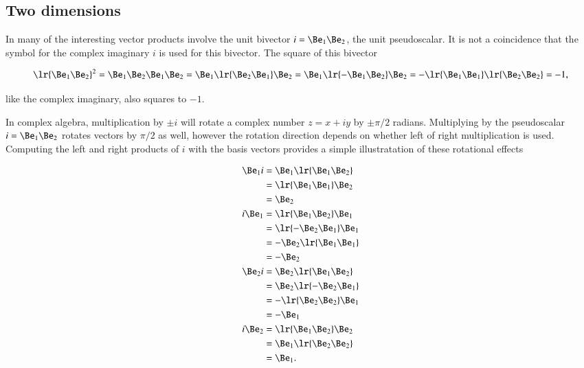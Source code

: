 
\subsection{Two dimensions}

In  many of the interesting vector products involve the unit bivector \( i = \Be_1 \Be_2 \), the  unit pseudoscalar.
It is not a coincidence that the symbol for the complex imaginary \( i \) is used for this bivector.
The square of this bivector

\begin{dmath}\label{eqn:SimpleProducts2:220}
   \lr{ \Be_1 \Be_2 }^2
   =
   \Be_1 \Be_2
   \Be_1 \Be_2
   =
   \Be_1 \lr{ \Be_2 \Be_1 } \Be_2
   =
   \Be_1 \lr{ -\Be_1 \Be_2 } \Be_2
   =
   -\lr{ \Be_1 \Be_1 }
   \lr{ \Be_2 \Be_2 }
   = -1,
\end{dmath}

like the complex imaginary, also squares to \( -1 \).

In complex algebra, multiplication by \( \pm i \) will rotate a complex number \( z = x + i y \) by \( \pm \pi/2 \) radians.
Multiplying by the pseudoscalar \( i = \Be_1 \Be_2 \) rotates vectors by \( \pi/2 \) as well, however the rotation direction depends on whether left of right multiplication is used.
Computing the left and right products of \( i \) with the basis vectors provides a
simple illustratation of these rotational effects

\begin{dmath}\label{eqn:SimpleProducts2:180}
\begin{aligned}
   \Be_1 i &= \Be_1 \lr{ \Be_1 \Be_2 } \\
           &= \lr{ \Be_1 \Be_1 } \Be_2 \\
           &= \Be_2 \\
   i \Be_1 &= \lr{ \Be_1 \Be_2 } \Be_1 \\
           &= \lr{ -\Be_2 \Be_1 } \Be_1 \\
           &= -\Be_2 \lr{ \Be_1 \Be_1 } \\
           &= -\Be_2 \\
   \Be_2 i &= \Be_2 \lr{ \Be_1 \Be_2 } \\
           &= \Be_2 \lr{ -\Be_2 \Be_1 } \\
           &= -\lr{ \Be_2 \Be_2 }\Be_1 \\
           &= -\Be_1 \\
   i \Be_2 &= \lr{ \Be_1 \Be_2 } \Be_2 \\
           &= \Be_1 \lr{ \Be_2 \Be_2 } \\
           &= \Be_1.
\end{aligned}
\end{dmath}

